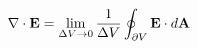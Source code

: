 \documentclass[preview]{standalone}
\begin{document}
\begin{align*}
\special{dvisvgm:raw <g id='unique000'>}\nabla\cdot\mathbf E=\lim_{\Delta V\to0}\frac{1}{\Delta V}\oint_{\partial V}\mathbf E\cdot d\mathbf A\special{dvisvgm:raw </g>}
\end{align*}
\end{document}
